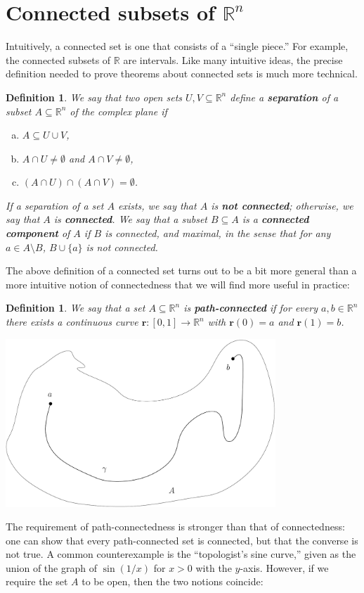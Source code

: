 \documentclass[12pt,letterpaper]{article}
\newtheorem{definition}[theorem]{Definition}
\newcommand{\R}{\mathbb{R}}
\renewcommand{\r}{\mathbf{r}}
\begin{document}
\section{Connected subsets of $\R^n$}
Intuitively, a connected set is one that consists of a ``single piece.''  For example, the connected subsets of $\mathbb{R}$ are intervals.  Like many intuitive ideas, the precise definition needed to prove theorems about connected sets is much more technical.
\begin{definition}
We say that two open sets $U,V\subseteq\R^n$ define a {\bf separation} of a subset $A\subseteq\R^n$ of the complex plane if
\begin{enumerate}[(a)]
\item $A\subseteq U\cup V$,
\item $A\cap U\neq \emptyset$ and $A\cap V\neq \emptyset$,
\item $(A\cap U)\cap (A\cap V) = \emptyset$.
\end{enumerate}
If a separation of a set $A$ exists, we say that $A$ is {\bf not connected}; otherwise, we say that $A$ is {\bf connected}.  We say that a subset $B\subseteq A$ is a {\bf connected component} of $A$ if $B$ is connected, and maximal, in the sense that for any $a\in A\setminus B$, $B\cup\{a\}$ is not connected.
\end{definition}
The above definition of a connected set turns out to be a bit more general than a more intuitive notion of connectedness that we will find more useful in practice:
\begin{definition}
We say that a set $A\subseteq \R^n$ is {\bf path-connected} if for every $a,b\in\R^n$ there exists a continuous curve $\r:[0,1]\to\R^n$ with $\r(0)=a$ and $\r(1)=b$.
\end{definition}
\begin{center}
\includegraphics[width=4in]{pathcon.pdf}
\end{center}
The requirement of path-connectedness is stronger than that of connectedness: one can show that every path-connected set is connected, but that the converse is not true.  A common counterexample is the ``topologist's sine curve,'' given as the union of the graph of $\sin(1/x)$ for $x>0$ with the $y$-axis.  However, if we require the set $A$ to be open, then the two notions coincide:
\end{document}
